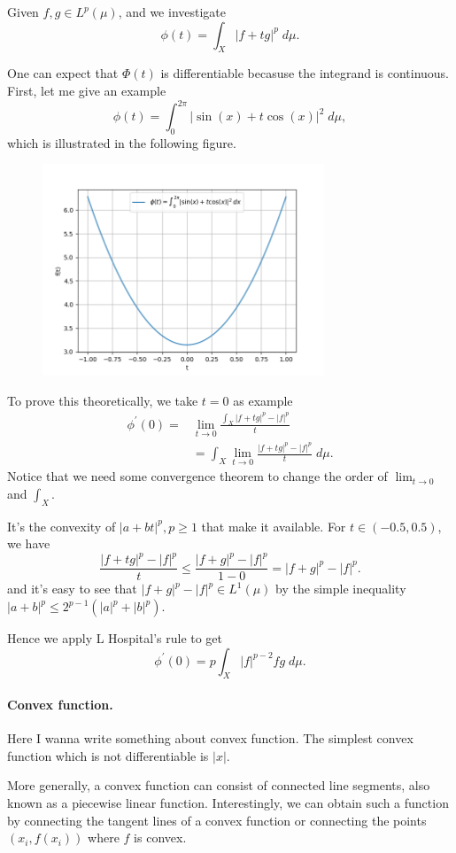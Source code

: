 \documentclass{article}
\begin{document}
Given $f, g\in L^{p}(\mu)$, and we investigate
$$
\phi(t)=\int_X|f+t g|^p \;d \mu.
$$

One can expect that $\Phi(t)$ is differentiable becasuse the integrand is continuous. First, let me give an example
$$
\phi(t)=\int_{0}^{2\pi}|\sin(x)+t \cos(x)|^2 \;d \mu,
$$
which is illustrated in the following figure.

\begin{figure}[ht]
    \centering
    \includegraphics[width=0.75\textwidth]{Figure_1.png}
    \caption{}
    \label{fig:my_label}
\end{figure}

To prove this theoretically, we take $t=0$ as example
$$
\begin{aligned}
\phi^{\prime}(0)=& \lim _{t \rightarrow 0} \frac{\int_{X}|f+tg|^{p}-|f|^{p}}{t} \\
&= \int_{X} \lim _{t \rightarrow 0} \frac{|f+tg|^{p}-|f|^{p}}{t} \;d \mu.
\end{aligned}
$$
Notice that we need some convergence theorem to change the order of $\lim_{t\to 0}$ and $\int_{X}$.

It's the convexity of $|a+bt|^{p},p\geq 1$ that make it available.
For $t\in(-0.5,0.5)$, we have 
$$
\frac{|f+tg|^{p}-|f|^{p}}{t} \leq \frac{|f+g|^{p}-|f|^{p}}{1-0} = |f+g|^{p}-|f|^{p}.
$$
and it's easy to see that $|f+g|^{p}-|f|^{p}\in L^{1}(\mu)$ by the simple inequality $|a+b|^{p}\leq 2^{p-1}(|a|^{p}+|b|^{p})$.

Hence we apply L Hospital's rule to get
$$
\phi^{\prime}(0)=p \int_X|f|^{p-2} f g \;d \mu .
$$


\paragraph{Convex function.}
Here I wanna write something about convex function. The simplest convex function which is not differentiable is $|x|$. 


More generally, a convex function can consist of connected line segments, also known as a piecewise linear function.
Interestingly, we can obtain such a function by connecting the tangent lines of a convex function or
connecting the points $(x_{i},f(x_{i}))$ where $f$ is convex.
\end{document}
